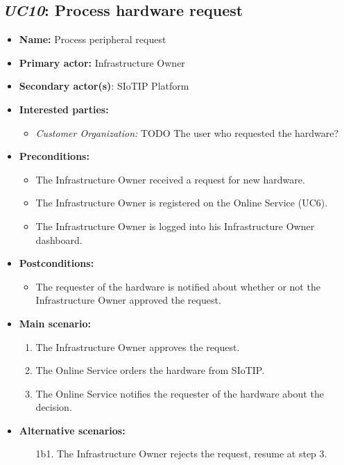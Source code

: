 \documentclass[english]{sareport}
\begin{document}
\subsection{\emph{UC10}: Process hardware request}
\begin{itemize}
    \item \textbf{Name:} Process peripheral request
    \item \textbf{Primary actor:} Infrastructure Owner
    \item \textbf{Secondary actor(s)}: SIoTIP Platform
    \item \textbf{Interested parties:} 
        \begin{itemize}
            \item \textit{Customer Organization:} TODO The user who requested the hardware?
        \end{itemize}

    \item \textbf{Preconditions:}
        \begin{itemize}
            \item The Infrastructure Owner received a request for new hardware.
            \item The Infrastructure Owner is registered on the Online Service (UC6).
            \item The Infrastructure Owner is logged into his Infrastructure Owner dashboard.
        \end{itemize}

    \item \textbf{Postconditions:}
        \begin{itemize}
            \item The requester of the hardware is notified about whether or not the Infrastructure Owner approved the request.
        \end{itemize}
        
    \item \textbf{Main scenario:} 
    \begin{enumerate}
       \item The Infrastructure Owner approves the request.
       \item The Online Service orders the hardware from SIoTIP.
       \item The Online Service notifies the requester of the hardware about the decision.
    \end{enumerate}

    \item \textbf{Alternative scenarios:} 
    \begin{enumerate}
        \item [1b1.] The Infrastructure Owner rejects the request, resume at step 3.
    \end{enumerate}
\end{itemize}
\end{document}
